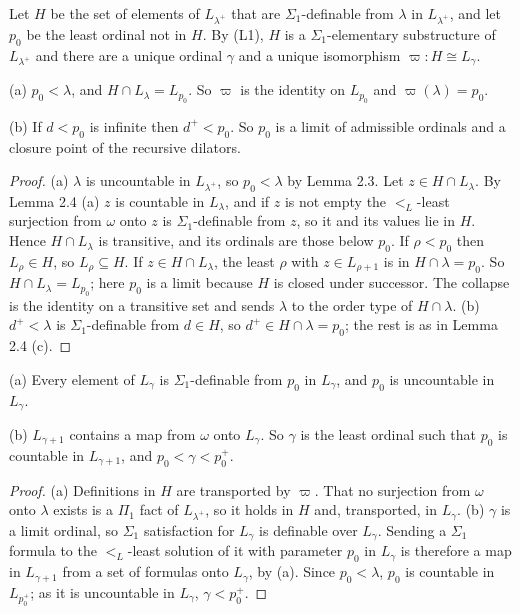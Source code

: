\documentclass[11pt]{article}
\begin{document}
Let $H$ be the set of elements of $L_{\lambda^+}$ that are $\Sigma_1$-definable from $\lambda$ in $L_{\lambda^+}$, and let $p_0$ be
the least ordinal not in $H$. By (L1), $H$ is a $\Sigma_1$-elementary substructure of $L_{\lambda^+}$ and there are a
unique ordinal $\gamma$ and a unique isomorphism $\varpi : H \cong L_{\gamma}$.

\begin{statement} (a) $p_0 < \lambda$, and $H \cap L_\lambda = L_{p_0}$. So $\varpi$ is the identity on
$L_{p_0}$ and $\varpi(\lambda) = p_0$.

(b) If $d < p_0$ is infinite then $d^+ < p_0$. So $p_0$ is a limit of admissible ordinals and a closure point
of the recursive dilators.
\end{statement}

\begin{proof} (a) $\lambda$ is uncountable in $L_{\lambda^+}$, so $p_0 < \lambda$ by Lemma 2.3. Let $z \in H \cap L_\lambda$. By Lemma
2.4 (a) $z$ is countable in $L_\lambda$, and if $z$ is not empty the $<_L$-least surjection from $\omega$ onto $z$ is $\Sigma_1$-definable
from $z$, so it and its values lie in $H$. Hence $H \cap L_\lambda$ is transitive, and its ordinals are those below
$p_0$. If $\rho < p_0$ then $L_{\rho} \in H$, so $L_{\rho} \subseteq H$. If $z \in H \cap L_\lambda$, the least
$\rho$ with $z \in L_{\rho + 1}$ is in $H \cap \lambda = p_0$. So $H \cap L_\lambda = L_{p_0}$; here $p_0$ is a limit
because $H$ is closed under successor. The collapse is the identity on a transitive set and sends $\lambda$ to the order
type of $H \cap \lambda$. (b) $d^+ < \lambda$ is $\Sigma_1$-definable from $d \in H$, so $d^+ \in H \cap \lambda = p_0$; the rest
is as in Lemma 2.4 (c).
\end{proof}

\begin{statement} (a) Every element of $L_{\gamma}$ is $\Sigma_1$-definable from $p_0$ in
$L_{\gamma}$, and $p_0$ is uncountable in $L_{\gamma}$.

(b) $L_{\gamma + 1}$ contains a map from $\omega$ onto $L_{\gamma}$. So $\gamma$ is the least ordinal such that
$p_0$ is countable in $L_{\gamma + 1}$, and $p_0 < \gamma < p_0^+$.
\end{statement}

\begin{proof} (a) Definitions in $H$ are transported by $\varpi$. That no surjection from $\omega$ onto $\lambda$ exists is
a $\Pi_1$ fact of $L_{\lambda^+}$, so it holds in $H$ and, transported, in $L_{\gamma}$. (b) $\gamma$ is a limit ordinal,
so $\Sigma_1$ satisfaction for $L_{\gamma}$ is definable over $L_{\gamma}$. Sending a $\Sigma_1$ formula to the
$<_L$-least solution of it with parameter $p_0$ in $L_\gamma$ is therefore a map in $L_{\gamma+1}$ from a set of formulas onto $L_{\gamma}$, by (a).
Since $p_0 < \lambda$, $p_0$ is countable in $L_{p_0^+}$; as it is uncountable in $L_{\gamma}$, $\gamma < p_0^+$.
\end{proof}
\end{document}
